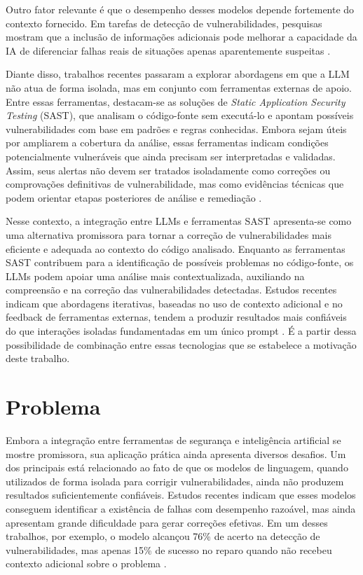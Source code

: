 Outro fator relevante é que o desempenho desses modelos depende fortemente do contexto fornecido. Em tarefas de detecção de vulnerabilidades, pesquisas mostram que a inclusão de informações adicionais pode melhorar a capacidade da IA de diferenciar falhas reais de situações apenas aparentemente suspeitas \cite{iranmanesh_zerofalse_2025}.

Diante disso, trabalhos recentes passaram a explorar abordagens em que a LLM não atua de forma isolada, mas em conjunto com ferramentas externas de apoio. Entre essas ferramentas, destacam-se as soluções de \textit{Static Application Security Testing} (SAST), que analisam o código-fonte sem executá-lo e apontam possíveis vulnerabilidades com base em padrões e regras conhecidas. Embora sejam úteis por ampliarem a cobertura da análise, essas ferramentas indicam condições potencialmente vulneráveis que ainda precisam ser interpretadas e validadas. Assim, seus alertas não devem ser tratados isoladamente como correções ou comprovações definitivas de vulnerabilidade, mas como evidências técnicas que podem orientar etapas posteriores de análise e remediação \cite{iranmanesh_zerofalse_2025}.

Nesse contexto, a integração entre LLMs e ferramentas SAST apresenta-se como uma alternativa promissora para tornar a correção de vulnerabilidades mais eficiente e adequada ao contexto do código analisado. Enquanto as ferramentas SAST contribuem para a identificação de possíveis problemas no código-fonte, os LLMs podem apoiar uma análise mais contextualizada, auxiliando na compreensão e na correção das vulnerabilidades detectadas. Estudos recentes indicam que abordagens iterativas, baseadas no uso de contexto adicional e no feedback de ferramentas externas, tendem a produzir resultados mais confiáveis do que interações isoladas fundamentadas em um único prompt \cite{sriram_improving_2026}. É a partir dessa possibilidade de combinação entre essas tecnologias que se estabelece a motivação deste trabalho.

\section{Problema}

Embora a integração entre ferramentas de segurança e inteligência artificial se mostre promissora, sua aplicação prática ainda apresenta diversos desafios. Um dos principais está relacionado ao fato de que os modelos de linguagem, quando utilizados de forma isolada para corrigir vulnerabilidades, ainda não produzem resultados suficientemente confiáveis. Estudos recentes indicam que esses modelos conseguem identificar a existência de falhas com desempenho razoável, mas ainda apresentam grande dificuldade para gerar correções efetivas. Em um desses trabalhos, por exemplo, o modelo alcançou 76\% de acerto na detecção de vulnerabilidades, mas apenas 15\% de sucesso no reparo quando não recebeu contexto adicional sobre o problema \cite{khan_code_2025}.

